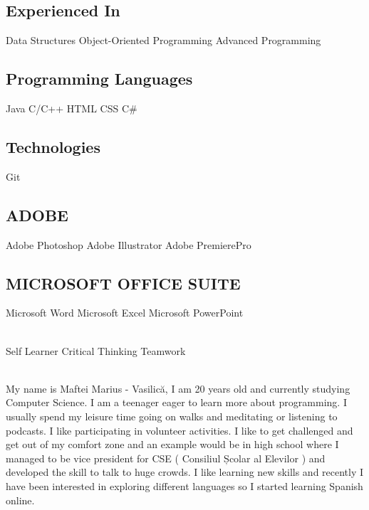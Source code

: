 \documentclass[a4paper]{MagicalCV}
\begin{document}
\hfill
\begin{minipage}[t]{0.59\textwidth} 


\subsection{Experienced In}
Data Structures \textbullet{} Object-Oriented Programming \textbullet{} Advanced Programming
\sectionsep

\subsection{Programming Languages}
Java \textbullet{} C/C++ \textbullet{} HTML \textbullet{} CSS \textbullet{} C\#
\sectionsep

\subsection{Technologies}
Git
\sectionsep

\subsection{ADOBE}
Adobe Photoshop \textbullet{} Adobe Illustrator \textbullet{} Adobe PremierePro
\sectionsep

\subsection{MICROSOFT OFFICE SUITE}
Microsoft Word \textbullet{} Microsoft Excel \textbullet{} Microsoft PowerPoint
\sectionsep

 \\
Self Learner \textbullet{} Critical Thinking \textbullet{} Teamwork
\sectionsep

\\
My name is Maftei Marius - Vasilică, I am 20 years old and currently studying Computer Science. I am a teenager eager to learn more about programming. I usually spend my leisure time going on walks and meditating or listening to podcasts. I like participating in volunteer activities. I like to get challenged and get out of my comfort zone and an example would be in high school where I managed to be vice president for CSE ( Consiliul Școlar al Elevilor ) and developed the skill to talk to huge crowds. I like learning new skills and recently I have been interested in exploring different languages so I started learning Spanish online.


\end{minipage} 
\end{document}
